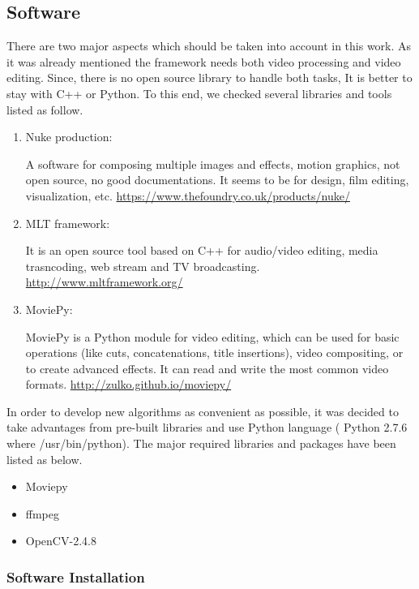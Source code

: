 \documentclass[[12pt,DIV14,BCOR12mm,a4paper,footexclude,headinclude,halfparskip-,twoside,openright,cleardoubleempty,idxtotoc,bibtotoc]{article}
\begin{document}
\subsection{Software}

There are two major aspects which should be taken into account in this work. As it was already mentioned the framework needs both video processing and video editing. Since, there is no open source library to handle both tasks, It is better to stay with C++ or Python. To this end, we checked several libraries and tools listed as follow.

\begin{enumerate}
\item Nuke production:

A software for composing multiple images and effects, motion graphics, not open source, no good documentations. It seems to be for design, film editing, visualization, etc. \url{https://www.thefoundry.co.uk/products/nuke/}

\item MLT framework:

It is an open source tool based on C++ for audio/video editing, media trasncoding, web stream and TV broadcasting. \url{http://www.mltframework.org/}


\item MoviePy:

MoviePy is a Python module for video editing, which can be used for basic operations (like cuts, concatenations, title insertions), video compositing, or to create advanced effects. It can read and write the most common video formats. \url{http://zulko.github.io/moviepy/}

\end{enumerate}

In order to develop new algorithms as convenient as possible, it was decided to take advantages from pre-built libraries and use Python language ( Python 2.7.6 where /usr/bin/python). The major required libraries and packages have been listed as below.



\begin{itemize}
	\item Moviepy
	\item ffmpeg
	\item OpenCV-2.4.8	
\end{itemize}



\subsubsection{Software Installation}
\end{document}

